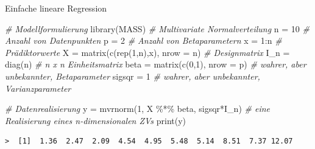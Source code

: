 \documentclass[
  8pt,
  ignorenonframetext,
]{beamer}
\newenvironment{Shaded}{\begin{snugshade}}{\end{snugshade}}
\newcommand{\AttributeTok}[1]{\textcolor[rgb]{0.77,0.63,0.00}{#1}}
\newcommand{\CommentTok}[1]{\textcolor[rgb]{0.56,0.35,0.01}{\textit{#1}}}
\newcommand{\DecValTok}[1]{\textcolor[rgb]{0.00,0.00,0.81}{#1}}
\newcommand{\FunctionTok}[1]{\textcolor[rgb]{0.00,0.00,0.00}{#1}}
\newcommand{\NormalTok}[1]{#1}
\newcommand{\OtherTok}[1]{\textcolor[rgb]{0.56,0.35,0.01}{#1}}
\newcommand{\SpecialCharTok}[1]{\textcolor[rgb]{0.00,0.00,0.00}{#1}}
\begin{document}
\begin{frame}[fragile]{Einfache lineare Regression}
\protect\hypertarget{einfache-lineare-regression-1}{}
\footnotesize

\begin{Shaded}
\begin{Highlighting}[]
\CommentTok{\# Modellformulierung}
\FunctionTok{library}\NormalTok{(MASS)                                }\CommentTok{\# Multivariate Normalverteilung}
\NormalTok{n      }\OtherTok{=} \DecValTok{10}                                  \CommentTok{\# Anzahl von Datenpunkten}
\NormalTok{p      }\OtherTok{=} \DecValTok{2}                                   \CommentTok{\# Anzahl von Betaparametern}
\NormalTok{x      }\OtherTok{=} \DecValTok{1}\SpecialCharTok{:}\NormalTok{n                                 }\CommentTok{\# Prädiktorwerte}
\NormalTok{X      }\OtherTok{=} \FunctionTok{matrix}\NormalTok{(}\FunctionTok{c}\NormalTok{(}\FunctionTok{rep}\NormalTok{(}\DecValTok{1}\NormalTok{,n),x), }\AttributeTok{nrow =}\NormalTok{ n)     }\CommentTok{\# Designmatrix}
\NormalTok{I\_n    }\OtherTok{=} \FunctionTok{diag}\NormalTok{(n)                             }\CommentTok{\# n x n Einheitsmatrix}
\NormalTok{beta   }\OtherTok{=} \FunctionTok{matrix}\NormalTok{(}\FunctionTok{c}\NormalTok{(}\DecValTok{0}\NormalTok{,}\DecValTok{1}\NormalTok{), }\AttributeTok{nrow =}\NormalTok{ p)            }\CommentTok{\# wahrer, aber unbekannter, Betaparameter}
\NormalTok{sigsqr }\OtherTok{=} \DecValTok{1}                                   \CommentTok{\# wahrer, aber unbekannter, Varianzparameter}

\CommentTok{\# Datenrealisierung}
\NormalTok{y      }\OtherTok{=} \FunctionTok{mvrnorm}\NormalTok{(}\DecValTok{1}\NormalTok{, X }\SpecialCharTok{\%*\%}\NormalTok{ beta, sigsqr}\SpecialCharTok{*}\NormalTok{I\_n)  }\CommentTok{\# eine Realisierung eines n{-}dimensionalen ZVs}
\FunctionTok{print}\NormalTok{(y)}
\end{Highlighting}
\end{Shaded}

\begin{verbatim}
>  [1]  1.36  2.47  2.09  4.54  4.95  5.48  5.14  8.51  7.37 12.07
\end{verbatim}
\end{frame}
\end{document}
